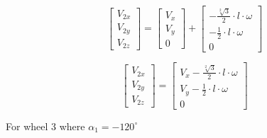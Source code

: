 \documentclass[answers]{exam}
\begin{document}
\begin{questions}
\begin{parts}
\begin{solution}
            \begin{equation*}
                \begin{bmatrix}
                    V_{2x}  \\
                    V_{2y} \\
                    V_{2z}
                \end{bmatrix}
                = \begin{bmatrix}
                    V_x \\
                    V_y \\
                    0
                \end{bmatrix} 
                + \begin{bmatrix}
                    - \frac{\sqrt[2]{3}}{2} \cdot l \cdot \omega \\
                    - \frac{1}{2} \cdot l \cdot \omega \\
                    0
                \end{bmatrix}
            \end{equation*}

            \begin{equation} \label{eq:2}
                \begin{bmatrix}
                    V_{2x}  \\
                    V_{2y} \\
                    V_{2z}
                \end{bmatrix}
                = \begin{bmatrix}
                    V_x - \frac{\sqrt[2]{3}}{2} \cdot l \cdot \omega \\
                    V_y - \frac{1}{2} \cdot l \cdot \omega \\
                    0
                \end{bmatrix} 
            \end{equation}

            For wheel 3 where $\alpha_1 = - 120^\circ$


\end{solution}
\end{parts}
\end{questions}
\end{document}
